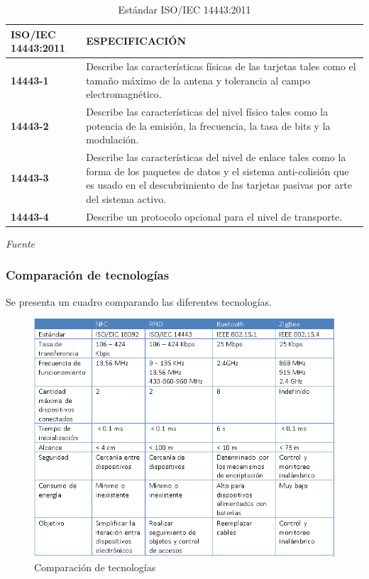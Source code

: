 \documentclass[11pt,openany]{book}
\newcounter{ns}
\begin{document}
	\begin{table}[htbp]
	\begin{center}
	\begin{tabular}{|l|p{9cm}|}\hline
	\textbf{ISO/IEC 14443:2011} &  \textbf{ESPECIFICACIÓN} \\ \hline
	\textbf{14443-1} & Describe las características físicas de las tarjetas tales como el tamaño máximo de la antena y tolerancia al campo electromagnético.\\ \hline 

	\textbf{14443-2}  & Describe las características del nivel físico tales como la potencia de la emisión, la frecuencia, la tasa de bits y la modulación.\\ \hline

	\textbf{14443-3} & Describe las características del nivel de enlace tales como la forma de los paquetes de datos y el sistema anti-colisión que es usado en el descubrimiento de las tarjetas pasivas por arte del sistema activo.\\ \hline 

	\textbf{14443-4} &Describe un protocolo opcional para el nivel de transporte. \\ \hline
	\end{tabular}
	\caption{Estándar ISO/IEC 14443:2011}
	\textsl{Fuente \cite{parte1,parte2,parte3,parte4}}
	\end{center}
	\end{table}

	\newpage

	\subsubsection{Comparación de tecnologías}

	Se presenta un cuadro comparando las diferentes tecnologías.

	\begin{figure}[htb]
			\centering
			\includegraphics[width=1.1\textwidth]{imagenes/tecnologias.PNG}
			\caption{Comparación de tecnologías}
			\label{tecnologias}
	\end{figure}
\end{document}

